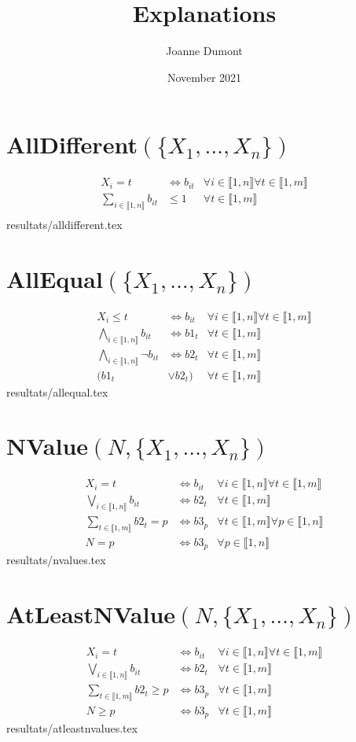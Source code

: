 \documentclass{article}
\title{Explanations}
\author{Joanne Dumont}
\date{November 2021}
\newcommand{\alldiff}{AllDifferent$(\{X_1,\ldots,X_n\})~$}
\newcommand{\alleq}{AllEqual$(\{X_1,\ldots,X_n\})~$}
\newcommand{\nvalue}{NValue$(N,\{X_1,\ldots,X_n\})~$}
\newcommand{\atlnvalue}{AtLeastNValue$(N,\{X_1,\ldots,X_n\})~$}
\newcommand{\I}{i\in\llbracket1,n\rrbracket}
\newcommand{\T}{t\in\llbracket1,m\rrbracket}
\newcommand{\PP}{p\in\llbracket1,n\rrbracket}
\newcommand{\fai}{\forall\I}
\newcommand{\fat}{\forall\T}
\newcommand{\fap}{\forall\PP}
\newcommand{\fit}{\fai\fat}
\begin{document}
\maketitle

\section{\texorpdfstring{\alldiff}{alldiff}}
\begin{align*}
    X_i = t &\iff b_{it}&\fai\fat\\
    \sum_{\I} b_{it}&\leq 1&\fat\\
\end{align*}
{resultats/alldifferent.tex}

\section{\texorpdfstring{\alleq}{alleq}}
\begin{align*}
    X_i \leq t & \iff b_{it}&\fit\\
    \bigwedge_{\I} b_{it} &\iff b1_t &\fat\\
    \bigwedge_{\I} \neg b_{it} &\iff b2_t &\fat\\
    (b1_t &\vee b2_t) &\fat
\end{align*}
{resultats/allequal.tex}

\section{\texorpdfstring{\nvalue}{nvalue}}
\begin{align*}
    X_i=t &\iff b_{it}&\fit\\
    \bigvee_{\I}b_{it}&\iff b2_t&\fat\\
    \sum_{\T}b2_{t} = p&\iff b3_{p}&\fat\fap\\
    N= p &\iff b3_p&\fap
\end{align*}
{resultats/nvalues.tex}

\section{\texorpdfstring{\atlnvalue}{atlnvalue}}
\begin{align*}
    X_i=t &\iff b_{it}&\fit\\
    \bigvee_{\I}b_{it}&\iff b2_t&\fat\\
    \sum_{\T}b2_{t} \geq p&\iff b3_{p}&\fat\\
    N\geq p &\iff b3_p&\fat
\end{align*}
{resultats/atleastnvalues.tex}
\end{document}
